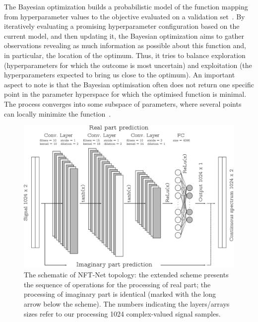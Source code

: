 The Bayesian optimization builds a probabilistic model of the function mapping from hyperparameter values to the objective evaluated on a validation set~\cite{mockus1975bayesian,pelikan1999boa}. By iteratively evaluating a promising hyperparameter configuration based on the current model, and then updating it, the Bayesian optimization aims to gather observations revealing as much information as possible about this function and, in particular, the location of the optimum. Thus, it tries to balance exploration (hyperparameters for which the outcome is most uncertain) and exploitation (the hyperparameters expected to bring us close to the optimum).
An important aspect to note is that the Bayesian optimisation often does not return one specific point in the parameter hyperspace for which the optimised function is minimal. The process converges into some subspace of parameters, where several points can locally minimize the function~\cite{pelikan1999boa}.

\begin{figure}[tbp]
    \centering
    \includegraphics[width=1.0\linewidth]{images/nn_nft/arch_new.pdf}
    \caption{The schematic of NFT-Net topology: the extended scheme presents the sequence of operations for the processing of real part; the processing of imaginary part is identical (marked with the long arrow below the scheme). The numbers indicating the layers/arrays sizes refer to our processing 1024 complex-valued signal samples.}
    \label{fig:nn_architecture}
\end{figure}



